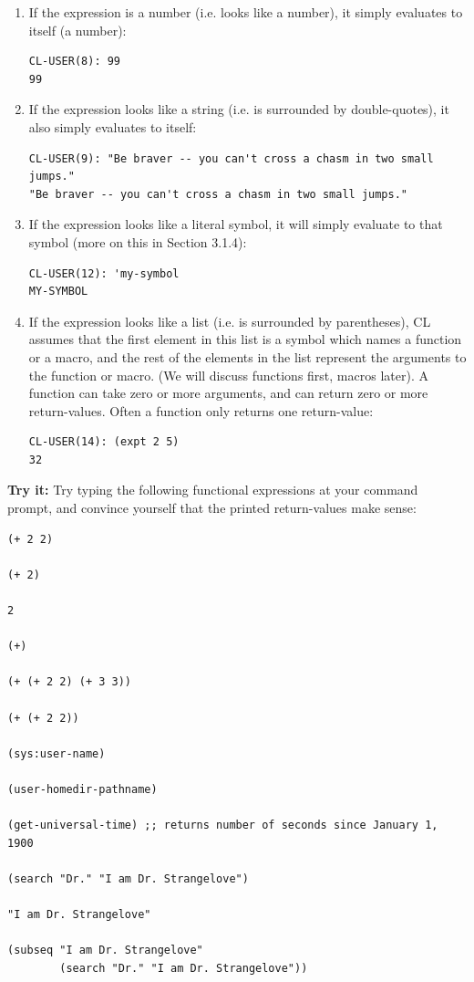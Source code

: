 \begin{enumerate}
\item If the expression is a number (i.e. looks like a number), it simply evaluates to itself (a
number):

\begin{verbatim}
CL-USER(8): 99
99
\end{verbatim}

\item If the expression looks like a string (i.e. is surrounded by double-quotes), it also simply
evaluates to itself:

\begin{verbatim}
CL-USER(9): "Be braver -- you can't cross a chasm in two small jumps."
"Be braver -- you can't cross a chasm in two small jumps."
\end{verbatim}

\item If the expression looks like a literal symbol, it will simply evaluate to that symbol
(more on this in Section 3.1.4):

\begin{verbatim}
CL-USER(12): 'my-symbol
MY-SYMBOL
\end{verbatim}

\item If the expression looks like a list (i.e. is surrounded by parentheses), CL assumes that
the first element in this list is a symbol which names a function or a macro, and
the rest of the elements in the list represent the arguments to the function or macro.
(We will discuss functions first, macros later). A function can take zero or more
arguments, and can return zero or more return-values. Often a function only returns
one return-value:

\begin{verbatim}
CL-USER(14): (expt 2 5)
32
\end{verbatim}
\end{enumerate}

\textbf{Try it:} Try typing the following functional expressions at your command prompt, and
convince yourself that the printed return-values make sense:

\begin{verbatim}
(+ 2 2)

(+ 2)

2

(+)

(+ (+ 2 2) (+ 3 3))

(+ (+ 2 2))

(sys:user-name)

(user-homedir-pathname)

(get-universal-time) ;; returns number of seconds since January 1, 1900

(search "Dr." "I am Dr. Strangelove")

"I am Dr. Strangelove"

(subseq "I am Dr. Strangelove"
        (search "Dr." "I am Dr. Strangelove"))
\end{verbatim}

